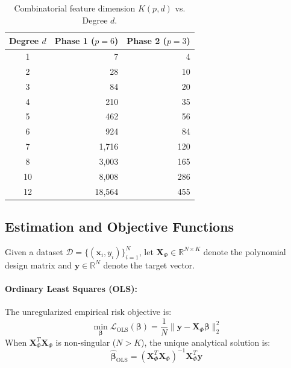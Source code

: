 \documentclass[10pt,twocolumn,a4paper]{article}
\begin{document}
\begin{table}[h]
\centering
\small
\caption{Combinatorial feature dimension $K(p, d)$ vs. Degree $d$.}
\label{tab:feature_dims}
\begin{tabular}{crr}
\toprule
\textbf{Degree $d$} & \textbf{Phase 1 ($p=6$)} & \textbf{Phase 2 ($p=3$)} \\
\midrule
1  & 7    & 4   \\
2  & 28   & 10  \\
3  & 84   & 20  \\
4  & 210  & 35  \\
5  & 462  & 56  \\
6  & 924  & 84  \\
7  & 1,716 & 120 \\
8  & 3,003 & 165 \\
10 & 8,008 & 286 \\
12 & 18,564 & 455 \\
\bottomrule
\end{tabular}
\end{table}

\subsection{Estimation and Objective Functions}
Given a dataset $\mathcal{D} = \{(\mathbf{x}_i, y_i)\}_{i=1}^N$, let $\mathbf{X}_\Phi \in \mathbb{R}^{N \times K}$ denote the polynomial design matrix and $\mathbf{y} \in \mathbb{R}^N$ denote the target vector. 

\paragraph{Ordinary Least Squares (OLS):}
The unregularized empirical risk objective is:
\begin{equation}
\min_{\boldsymbol{\beta}} \mathcal{L}_{\text{OLS}}(\boldsymbol{\beta}) = \frac{1}{N} \|\mathbf{y} - \mathbf{X}_\Phi \boldsymbol{\beta}\|_2^2
\end{equation}
When $\mathbf{X}_\Phi^T \mathbf{X}_\Phi$ is non-singular ($N > K$), the unique analytical solution is:
\begin{equation}
\hat{\boldsymbol{\beta}}_{\text{OLS}} = (\mathbf{X}_\Phi^T \mathbf{X}_\Phi)^{-1} \mathbf{X}_\Phi^T \mathbf{y}
\end{equation}
\end{document}
